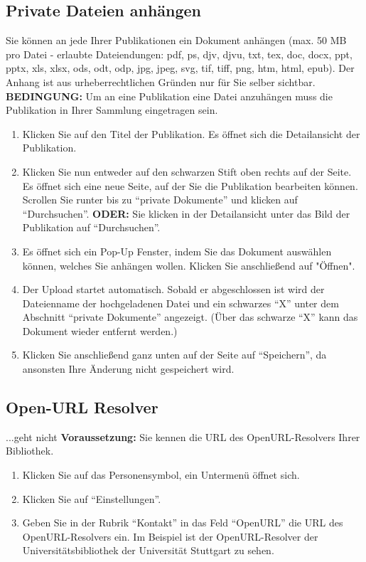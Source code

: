 \documentclass[a4paper,11pt,twoside]{scrbook}
\begin{document}
\subsection{Private Dateien anhängen}
Sie können an jede Ihrer Publikationen ein Dokument anhängen (max. 50 MB pro Datei - erlaubte Dateiendungen: pdf, ps, djv, djvu, txt, tex, doc, docx, ppt, pptx, xls, xlsx, ods, odt, odp, jpg, jpeg, svg, tif, tiff, png, htm, html, epub). Der Anhang ist aus urheberrechtlichen Gründen nur für Sie selber sichtbar.
\newline
\newline
\textbf{BEDINGUNG:} Um an eine Publikation eine Datei anzuhängen muss die Publikation in Ihrer Sammlung eingetragen sein.
\begin{enumerate}
    \item Klicken Sie auf den Titel der Publikation. Es öffnet sich die Detailansicht der Publikation.
    \item Klicken Sie nun entweder auf den schwarzen Stift oben rechts auf der Seite. Es öffnet sich eine neue Seite, auf der Sie die Publikation bearbeiten können. Scrollen Sie runter bis zu \enquote{private Dokumente} und klicken auf \enquote{Durchsuchen}. \newline \textbf{ODER:} Sie klicken in der Detailansicht unter das Bild der Publikation auf \enquote{Durchsuchen}.
    \item Es öffnet sich ein Pop-Up Fenster, indem Sie das Dokument auswählen können, welches Sie anhängen wollen. Klicken Sie anschließend auf "Öffnen".
    \item Der Upload startet automatisch. Sobald er abgeschlossen ist wird der Dateienname der hochgeladenen Datei und ein schwarzes \enquote{X} unter dem Abschnitt \enquote{private Dokumente} angezeigt. (Über das schwarze \enquote{X} kann das Dokument wieder entfernt werden.)
    \item Klicken Sie anschließend ganz unten auf der Seite auf \enquote{Speichern}, da ansonsten Ihre Änderung nicht gespeichert wird.
\end{enumerate}
\subsection{Open-URL Resolver}%
...\newline geht nicht
\textbf{Voraussetzung:} Sie kennen die URL des OpenURL-Resolvers Ihrer Bibliothek.
\begin{enumerate}
    \item Klicken Sie auf das Personensymbol, ein Untermenü öffnet sich.
    \item Klicken Sie auf \enquote{Einstellungen}.
    \item Geben Sie in der Rubrik \enquote{Kontakt} in das Feld \enquote{OpenURL} die URL des OpenURL-Resolvers ein. Im Beispiel ist der OpenURL-Resolver der Universitätsbibliothek der Universität Stuttgart zu sehen. 
\end{enumerate}
\end{document}
